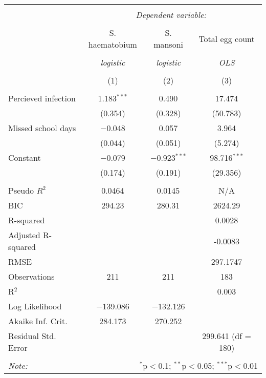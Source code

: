 
\begin{table}[!htbp] \centering 
  \caption{} 
  \label{} 
\begin{tabular}{@{\extracolsep{3pt}}lccc} 
\\[-1.8ex]\hline 
\hline \\[-1.8ex] 
 & \multicolumn{3}{c}{\textit{Dependent variable:}} \\ 
\cline{2-4} 
\\[-1.8ex] & S. haematobium & S. mansoni & Total egg count \\ 
\\[-1.8ex] & \textit{logistic} & \textit{logistic} & \textit{OLS} \\ 
\\[-1.8ex] & (1) & (2) & (3)\\ 
\hline \\[-1.8ex] 
 Percieved infection & 1.183$^{***}$ & 0.490 & 17.474 \\ 
  & (0.354) & (0.328) & (50.783) \\ 
  Missed school days & $-$0.048 & 0.057 & 3.964 \\ 
  & (0.044) & (0.051) & (5.274) \\ 
  Constant & $-$0.079 & $-$0.923$^{***}$ & 98.716$^{***}$ \\ 
  & (0.174) & (0.191) & (29.356) \\ 
 \hline \\[-1.8ex] 
Pseudo $R^2$ & 0.0464 & 0.0145 & N/A \\ 
BIC & 294.23 & 280.31 & 2624.29 \\ 
R-squared &  &  & 0.0028 \\ 
Adjusted R-squared &  &  & -0.0083 \\ 
RMSE &  &  & 297.1747 \\ 
Observations & 211 & 211 & 183 \\ 
R$^{2}$ &  &  & 0.003 \\ 
Log Likelihood & $-$139.086 & $-$132.126 &  \\ 
Akaike Inf. Crit. & 284.173 & 270.252 &  \\ 
Residual Std. Error &  &  & 299.641 (df = 180) \\ 
\hline 
\hline \\[-1.8ex] 
\textit{Note:}  & \multicolumn{3}{r}{$^{*}$p$<$0.1; $^{**}$p$<$0.05; $^{***}$p$<$0.01} \\ 
\end{tabular} 
\end{table} 
